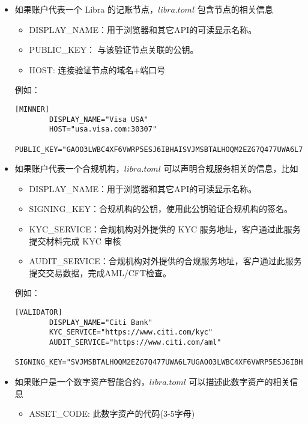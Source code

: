 \begin{itemize}
    \item 如果账户代表一个 Libra 的记账节点，$libra.toml$ 包含节点的相关信息
        \begin{itemize}
            \item DISPLAY\_NAME：用于浏览器和其它API的可读显示名称。
            \item PUBLIC\_KEY： 与该验证节点关联的公钥。
            \item HOST: 连接验证节点的域名+端口号
        \end{itemize}
        例如：
        \begin{lstlisting}[caption={记账节点配置信息}, label={lst:validator}]
        [MINNER]
        DISPLAY_NAME="Visa USA"
        HOST="usa.visa.com:30307"
        PUBLIC_KEY="GAOO3LWBC4XF6VWRP5ESJ6IBHAISVJMSBTALHOQM2EZG7Q477UWA6L7U"
        \end{lstlisting}
        
    \item 如果账户代表一个合规机构，$libra.toml$ 可以声明合规服务相关的信息，比如
        \begin{itemize}
            \item DISPLAY\_NAME：用于浏览器和其它API的可读显示名称。

            \item SIGNING\_KEY：合规机构的公钥，使用此公钥验证合规机构的签名。
            
            \item KYC\_SERVICE：合规机构对外提供的 KYC 服务地址，客户通过此服务提交材料完成 KYC 审核

            \item AUDIT\_SERVICE：合规机构对外提供的合规服务地址，客户通过此服务提交交易数据，完成AML/CFT检查。

        \end{itemize}
        例如：
        \begin{lstlisting}[caption={验证机构配置信息}, label={lst:validator}]
        [VALIDATOR]
        DISPLAY_NAME="Citi Bank"
        KYC_SERVICE="https://www.citi.com/kyc"
        AUDIT_SERVICE="https://www.citi.com/aml"
        SIGNING_KEY="SVJMSBTALHOQM2EZG7Q477UWA6L7UGAOO3LWBC4XF6VWRP5ESJ6IBHAI"
        \end{lstlisting}

    \item 如果账户是一个数字资产智能合约，$libra.toml$ 可以描述此数字资产的相关信息
        \begin{itemize}
            \item ASSET\_CODE: 此数字资产的代码(3-5字母)
            

\end{itemize}
\end{itemize}
